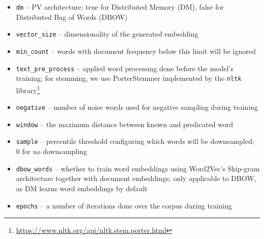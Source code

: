 \begin{itemize}

  \item \texttt{dm} --  PV architecture; true for Distributed Memory (DM),
    false for Distributed Bag of Words (DBOW)

  \item \texttt{vector\_size} -- dimensionality of the generated embedding

  \item \texttt{min\_count} -- words with document frequency below this limit
    will be ignored

  \item \texttt{text\_pre\_process} -- applied word processing done before the
    model's training; for stemming, we use PorterStemmer implemented by the \texttt{nltk}
    library\footnote{\url{https://www.nltk.org/api/nltk.stem.porter.html}}

  \item \texttt{negative} -- number of noise words used for negative sampling
    during training

  \item \texttt{window} -- the maximum distance between known and predicated
    word

  \item \texttt{sample} -- percentile threshold configuring which words will be
    downsampled; 0 for no downsampling


  \item \texttt{dbow\_words} -- whether to train word embeddings using
    Word2Vec's \citep{mikolov2013efficient} Skip-gram architecture together
    with document embeddings; only applicable to DBOW, as DM learns word embeddings by default

  \item \texttt{epochs} -- a number of iterations done over the corpus during
    training

\end{itemize}


